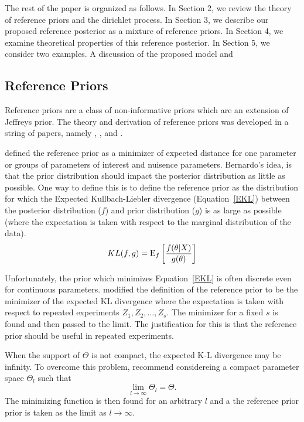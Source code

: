 \documentclass[11pt,a4paper,notitlepage]{article}
\begin{document}
The rest of the paper is organized as follows. In Section 2, we review
the theory of reference priors and the dirichlet process.  In Section
3, we describe our proposed reference posterior as a mixture of
reference priors.  In Section 4, we examine theoretical properties of
this reference posterior.  In Section 5, we consider two examples. A
discussion of the proposed model and

\subsection{Reference Priors}
Reference priors are a class of non-informative priors which are an
extension of Jeffreys prior.  The theory and derivation of reference
priors was developed in a string of papers, namely \cite{Bernardo1979}
\cite{BergerBernardo1992b}, \cite{BergerBernardo1992}, and
\cite{BergerBernardoSun2009}.

\cite{Bernardo1979} defined the reference prior as a minimizer of
expected distance for one parameter or groups of parameters of
interest and nuisence parameters.  Bernardo's idea, is that the prior
distribution should impact the posterior distribution as little as
possible.  One way to define this is to define the reference prior as
the distribution for which the Expected Kullbach-Liebler divergence
(Equation~\eqref{EKL}) between the posterior distribution ($f$) and
prior distribution ($g$) is as large as possible (where the
expectation is taken with respect to the marginal distribution of the
data).
\begin{equation}
KL(f,g) = {\rm E}_{f}\left[\frac{f(\theta|X)}{g(\theta)}\right] \label{EKL}
\end{equation}

Unfortunately, the prior which minimizes Equation~\eqref{EKL} is often
discrete even for continuous parameters.  \cite{BergerBernardo1992b}
modified the definition of the reference prior to be the minimizer of
the expected KL divergence where the expectation is taken with respect
to repeated experiments $Z_1, Z_2, \ldots, Z_s$.  The minimizer for a
fixed $s$ is found and then passed to the limit.  The justification
for this is that the reference prior should be useful in repeated
experiments.

When the support of $\Theta$ is not compact, the expected K-L divergence 
may be infinity.  To overcome this problem,  \cite{BergerBernardo1992} 
recommend considereing a compact parameter space $\Theta_l$ such that 
\[
\lim_{l \to \infty} \Theta_l = \Theta.
\]
The minimizing function is then found for an arbitrary $l$ and a the
reference prior prior is taken as the limit as $l \to \infty$.
\end{document}
